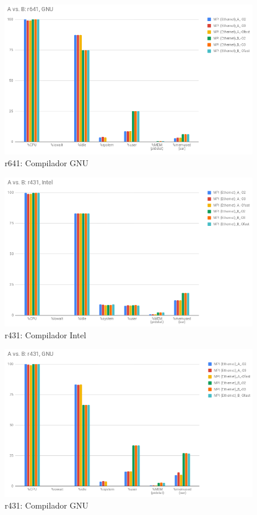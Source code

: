 \documentclass{article}
\begin{document}
\begin{appendices}
\begin{figure}[H]
    \centering
    \includegraphics[width=12cm]{Pictures/FT_A_B_r641_GNU.png}
    \caption{r641: Compilador GNU}
    \label{fig:ft_A_B_r641_gnu}
\end{figure}

\begin{figure}[H]
    \centering
    \includegraphics[width=12cm]{Pictures/FT_A_B_r431_Intel.png}
    \caption{r431: Compilador Intel}
    \label{fig:ft_A_B_r431_intel}
\end{figure}

\begin{figure}[H]
    \centering
    \includegraphics[width=12cm]{Pictures/FT_A_B_r431_GNU.png}
    \caption{r431: Compilador GNU}
    \label{fig:ft_A_B_r431_gnu}
\end{figure}


\end{appendices}
\end{document}
